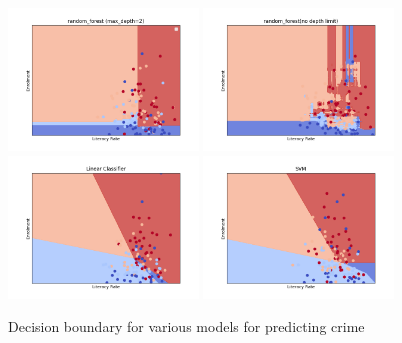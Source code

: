 \documentclass[twoside]{article}
\begin{document}
\begin{figure}[h]
    \centering
    \includegraphics[width=0.45\textwidth]{random_forest(depth_limit=2)_literacy&incentive_vs_crime_2016.png}
     \includegraphics[width=0.45\textwidth]{random_forest(no_limit)_literacy&incentive_vs_crime_2016.png}
     \includegraphics[width=0.45\textwidth]{linear_classifier_literacy&incentive_vs_crime_2016.png}
     \includegraphics[width=0.45\textwidth]{svm_classifier_literacy&incentive_vs_crime_2016.png}
     \caption{Decision boundary for various models for predicting crime}
    \label{fig:crime_decision}
\end{figure}
\end{document}
